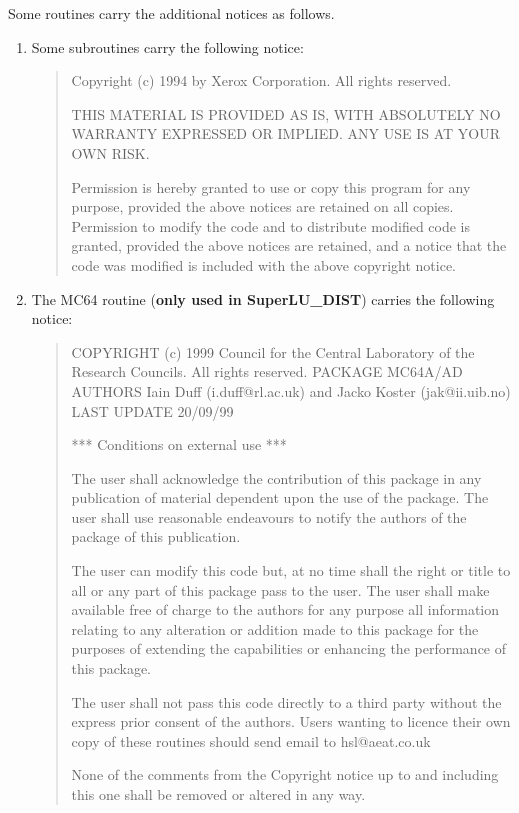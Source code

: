 Some routines carry the additional notices as follows.
\begin{enumerate}

\item Some subroutines carry the following notice:
\begin{quote}
  Copyright (c) 1994 by Xerox Corporation.  All rights reserved.

  THIS MATERIAL IS PROVIDED AS IS, WITH ABSOLUTELY NO WARRANTY
  EXPRESSED OR IMPLIED.  ANY USE IS AT YOUR OWN RISK.

  Permission is hereby granted to use or copy this program for any
  purpose, provided the above notices are retained on all copies.
  Permission to modify the code and to distribute modified code is
  granted, provided the above notices are retained, and a notice that
  the code was modified is included with the above copyright notice.
\end{quote}

\item The MC64 routine ({\bf only used in SuperLU\_DIST}) carries the
      following notice:
\begin{quote}
  COPYRIGHT (c) 1999  Council for the Central Laboratory of the
  Research Councils.    All rights reserved.
  PACKAGE MC64A/AD
  AUTHORS Iain Duff (i.duff@rl.ac.uk) and Jacko Koster (jak@ii.uib.no)
  LAST UPDATE 20/09/99
  
  *** Conditions on external use ***
 
  The user shall acknowledge the contribution of this
  package in any publication of material dependent upon the use of
  the package. The user shall use reasonable endeavours to notify
  the authors of the package of this publication.
  
  The user can modify this code but, at no time
  shall the right or title to all or any part of this package pass
  to the user. The user shall make available free of charge
  to the authors for any purpose all information relating to any
  alteration or addition made to this package for the purposes of
  extending the capabilities or enhancing the performance of this
  package.
  
  The user shall not pass this code directly to a third party without the
  express prior consent of the authors.  Users wanting to licence their
  own copy of these routines should send email to hsl@aeat.co.uk
  
  None of the comments from the Copyright notice up to and including this
  one shall be removed or altered in any way.
\end{quote}

\end{enumerate}

